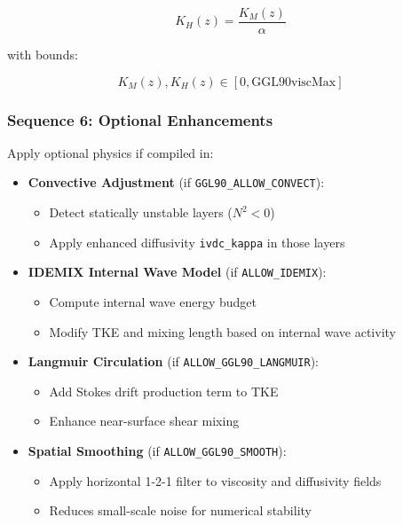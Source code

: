\documentclass[11pt, a4paper]{article}
\begin{document}
\begin{equation}
K_H(z) = \frac{K_M(z)}{\alpha}
\end{equation}

with bounds:

\begin{equation}
K_M(z), K_H(z) \in [0, \text{GGL90viscMax}]
\end{equation}

\subsubsection{Sequence 6: Optional Enhancements}

Apply optional physics if compiled in:

\begin{itemize}
    \item \textbf{Convective Adjustment} (if \texttt{GGL90\_ALLOW\_CONVECT}):
    \begin{itemize}
        \item Detect statically unstable layers ($N^2 < 0$)
        \item Apply enhanced diffusivity \texttt{ivdc\_kappa} in those layers
    \end{itemize}
    
    \item \textbf{IDEMIX Internal Wave Model} (if \texttt{ALLOW\_IDEMIX}):
    \begin{itemize}
        \item Compute internal wave energy budget
        \item Modify TKE and mixing length based on internal wave activity
    \end{itemize}
    
    \item \textbf{Langmuir Circulation} (if \texttt{ALLOW\_GGL90\_LANGMUIR}):
    \begin{itemize}
        \item Add Stokes drift production term to TKE
        \item Enhance near-surface shear mixing
    \end{itemize}
    
    \item \textbf{Spatial Smoothing} (if \texttt{ALLOW\_GGL90\_SMOOTH}):
    \begin{itemize}
        \item Apply horizontal 1-2-1 filter to viscosity and diffusivity fields
        \item Reduces small-scale noise for numerical stability
    \end{itemize}
\end{itemize}
\end{document}
